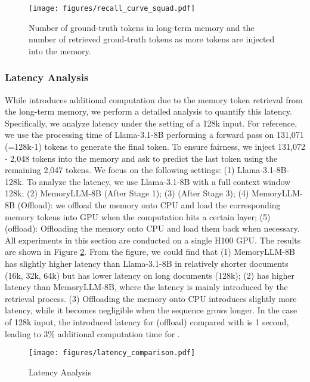 \begin{figure}
    \centering
    \texttt{[image: figures/recall\_curve\_squad.pdf]}
    \vspace{-20pt}
    \caption{Number of ground-truth tokens in long-term memory and the number of retrieved groud-truth tokens as more tokens are injected into the memory.}
    \label{fig:recall_curve_squad}
    \vspace{-15pt}
\end{figure}


\vspace{-5pt}
\subsubsection{Latency Analysis}
\label{sub:latency_analysis}
\vspace{-5pt}
While \ours introduces additional computation due to the memory token retrieval from the long-term memory, we perform a detailed analysis to quantify this latency. Specifically, we analyze latency under the setting of a 128k input. For reference, we use the processing time of Llama-3.1-8B performing a forward pass on 131,071 (=128k-1) tokens to generate the final token. To ensure fairness, we inject 131,072 - 2,048 tokens into the memory and ask \ours to predict the last token using the remaining 2,047 tokens. 
We focus on the following settings: (1) Llama-3.1-8B-128k. To analyze the latency, we use Llama-3.1-8B with a full context window 128k; (2) MemoryLLM-8B (After Stage 1); (3) \ours (After Stage 3); (4) MemoryLLM-8B (Offload): we offload the memory onto CPU and load the corresponding memory tokens into GPU when the computation hits a certain layer; (5) \ours (offload): Offloading the memory onto CPU and load them back when necessary. 
All experiments in this section are conducted on a single H100 GPU. The results are shown in Figure \ref{fig:latency_analysis}. From the figure, we could find that (1) MemoryLLM-8B has slightly higher latency than Llama-3.1-8B in relatively shorter documents (16k, 32k, 64k) but has lower latency on long documents (128k); (2) \ours has higher latency than MemoryLLM-8B, where the latency is mainly introduced by the retrieval process. (3) Offloading the memory onto CPU introduces slightly more latency, while it becomes negligible when the sequence grows longer. In the case of 128k input, the introduced latency for \ours (offload) compared with \ours is 1 second, leading to 3\% additional computation time for \ours. 

\begin{figure}
    \centering
    \texttt{[image: figures/latency\_comparison.pdf]}
    \vspace{-20pt}
    \caption{Latency Analysis}
    \label{fig:latency_analysis}
    \vspace{-15pt}
\end{figure}


